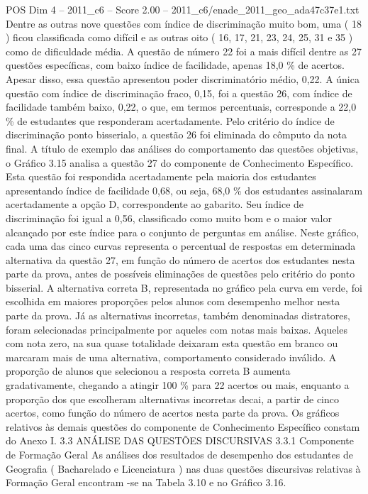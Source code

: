 \begin{textsample}{POS Dim 4 – 2011\_c6 – Score 2.00 – 2011\_c6/enade\_2011\_geo\_ada47c37e1.txt}
Dentre as outras nove questões com índice de discriminação muito bom, uma ( 18 ) ficou classificada como difícil e as outras oito ( 16, 17, 21, 23, 24, 25, 31 e 35 ) como de dificuldade média.
A questão de número 22 foi a mais difícil dentre as 27 questões específicas, com baixo índice de facilidade, apenas 18,0 \% de acertos.
Apesar disso, essa questão apresentou poder discriminatório médio, 0,22.
A única questão com índice de discriminação fraco, 0,15, foi a questão 26, com índice de facilidade também baixo, 0,22, o que, em termos percentuais, corresponde a 22,0 \% de estudantes que responderam acertadamente.
Pelo critério do índice de discriminação ponto bisserialo, a questão 26 foi eliminada do cômputo da nota final.
A título de exemplo das análises do comportamento das questões objetivas, o Gráfico 3.15 analisa a questão 27 do componente de Conhecimento Específico.
Esta questão foi respondida acertadamente pela maioria dos estudantes apresentando índice de facilidade 0,68, ou seja, 68,0 \% dos estudantes assinalaram acertadamente a opção D, correspondente ao gabarito.
Seu índice de discriminação foi igual a 0,56, classificado como muito bom e o maior valor alcançado por este índice para o conjunto de perguntas em análise.
Neste gráfico, cada uma das cinco curvas representa o percentual de respostas em determinada alternativa da questão 27, em função do número de acertos dos estudantes nesta parte da prova, antes de possíveis eliminações de questões pelo critério do ponto bisserial.
A alternativa correta B, representada no gráfico pela curva em verde, foi escolhida em maiores proporções pelos alunos com desempenho melhor nesta parte da prova.
Já as alternativas incorretas, também denominadas distratores, foram selecionadas principalmente por aqueles com notas mais baixas.
Aqueles com nota zero, na sua quase totalidade deixaram esta questão em branco ou marcaram mais de uma alternativa, comportamento considerado inválido.
A proporção de alunos que selecionou a resposta correta B aumenta gradativamente, chegando a atingir 100 \% para 22 acertos ou mais, enquanto a proporção dos que escolheram alternativas incorretas decai, a partir de cinco acertos, como função do número de acertos nesta parte da prova.
Os gráficos relativos às demais questões do componente de Conhecimento Específico constam do Anexo I. 3.3 ANÁLISE DAS QUESTÕES DISCURSIVAS 3.3.1 Componente de Formação Geral As análises dos resultados de desempenho dos estudantes de Geografia ( Bacharelado e Licenciatura ) nas duas questões discursivas relativas à Formação Geral encontram -se na Tabela 3.10 e no Gráfico 3.16.

\end{textsample}
